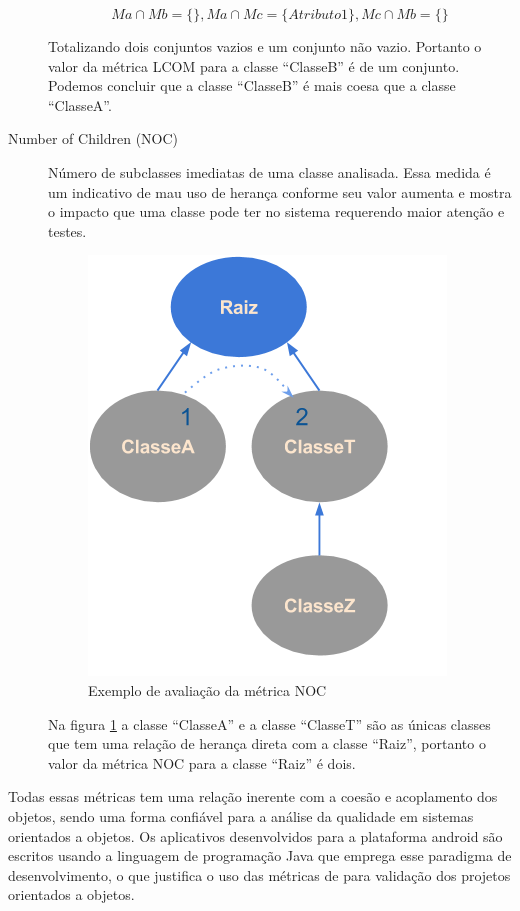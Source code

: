 \documentclass[conference]{IEEEtran}
\begin{document}
\begin{description}
\[
Ma \cap Mb = \{ \},
Ma \cap Mc = \{ Atributo1 \},
Mc \cap Mb = \{ \}
\]

Totalizando dois conjuntos vazios e um conjunto não vazio. Portanto o valor da
métrica LCOM para a classe ``ClasseB'' é de um conjunto. Podemos concluir que a
classe ``ClasseB'' é mais coesa que  a classe ``ClasseA''.

\item[Number of Children (NOC)] Número de subclasses imediatas de uma
classe analisada. Essa medida é um indicativo de mau uso de herança conforme seu
valor aumenta e mostra o impacto que uma classe pode ter no sistema requerendo maior
atenção e testes.

\begin{figure}[htb]
	\begin{center}
		\includegraphics[scale=0.6]{img/pic_noc.png}
	\end{center}
	\caption{\label{fig:pic_noc}Exemplo de avaliação da métrica NOC}
	
\end{figure}

Na figura \ref{fig:pic_noc} a classe ``ClasseA'' e a classe ``ClasseT'' são as
únicas classes que tem uma relação de herança direta com a classe ``Raiz'',
portanto o valor da métrica NOC para a classe ``Raiz'' é  dois.

\end{description}

Todas essas métricas tem uma relação inerente com a coesão e acoplamento dos
objetos, sendo uma forma confiável para a análise da qualidade em sistemas
orientados a objetos. Os aplicativos desenvolvidos para a plataforma android são
escritos usando a linguagem de programação Java que emprega esse paradigma de
desenvolvimento, o que justifica o uso das métricas de  para
validação dos projetos orientados a objetos.
\end{document}
